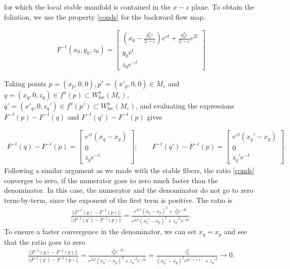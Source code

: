\begin{solution}[9.5]
\begin{enumerate}
for which the local stable manifold is contained in the $x-z$ plane. To obtain the foliation, we use the property \eqref{conds} for the backward flow map.

\begin{align}
\label{eqflowmap2}
F^{-t}(x_0,y_0,z_0) = \begin{bmatrix}
\left(x_0 - \frac{y_0^2 \varepsilon }{2-\varepsilon}\right)e^{\varepsilon t} + \frac{y_0^2\varepsilon}{2-\varepsilon}e^{2t} \\
y_0e^{t} \\
z_0e^{-t}
\end{bmatrix} 
\end{align}

Taking points $p = (x_p, 0, 0), p' = (x'_p, 0, 0)\in M_\varepsilon $ and $q = (x_q, 0, z_q) \in f^u(p)\subset W^u_{\text{loc}}(M_\varepsilon)$, $q' = (x'_q, 0, z_q')\in f^u(p')\subset W^u_{\text{loc}}(M_\varepsilon)$, and evaluating the expressions $F^{-t}(p)-F^{-t}(q)$ and $F^{-t}(q')-F^{-t}(p)$ gives

\begin{align}
\label{eqdiffback}
F^{-t}(q) - F^{-t}(p) = \begin{bmatrix}
e^{\varepsilon t} \left(x_q  - x_p \right)\\
0 \\
z_q e^{-t}
\end{bmatrix}; \qquad  F^{-t}(q') - F^{-t}(p) = \begin{bmatrix}
e^{\varepsilon t} \left(x_q' - x_p \right)\\
0 \\
z_q' e^{-t}
\end{bmatrix}.
\end{align}
Following a similar argument as we made with the stable fibers, the ratio \eqref{conds} converges to zero, if the numerator goes to zero much faster than the denominator. In this case, the numerator and the denominator do not go to zero term-by-term, since the exponent of the first term is positive. The ratio is 
\begin{align}
    \frac{||F^{-t}(q) - F^{-t}(p)||}{||F^{-t}(q') - F^{-t}(p)||} = \frac{e^{2\varepsilon t}(x_q-x_p)^2 + z_q^2 e^{-2t}}{e^{2\varepsilon t}(x_q'-x_p)^2 + z_q'^2 e^{-2t}}.
\end{align}
To ensure a faster convergence in the denominator, we can set $x_q = x_p$ and see that the ratio goes to zero
\begin{align}
    \frac{||F^{-t}(q) - F^{-t}(p)||}{||F^{-t}(q') - F^{-t}(p)||} = \frac{z_q^2 e^{-2t}}{e^{2\varepsilon t}(x_q'-x_p)^2 + z_q'^2 e^{-2t}} = \frac{z_q^2 }{(x_q'-x_p)^2e^{2t(\varepsilon +1)} + z_q'^2} \to 0.
\end{align}


\end{enumerate}
\end{solution}
